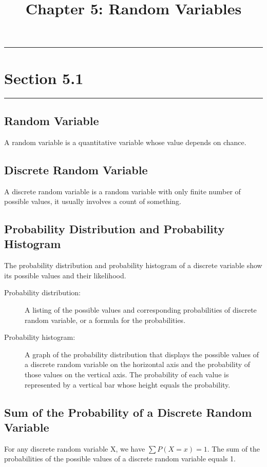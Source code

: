 \documentclass[12pt]{article}
\title{Chapter 5: Random Variables}
\author{}
\begin{document}
    \maketitle

    \noindent\rule{\textwidth}{0.4pt}
    \section*{Section 5.1}
    \noindent\rule{\textwidth}{0.4pt}
        \subsection*{Random Variable}
            A random variable is a quantitative variable whose value depends on chance.
        \subsection*{Discrete Random Variable}
            A discrete random variable is a random variable with only finite number of possible values, it
            usually involves a count of something.
        \subsection*{Probability Distribution and Probability Histogram}
            The probability distribution and probability histogram of a discrete variable show its 
            possible values and their likelihood.
            \begin{description}
                \item[Probability distribution:] A listing of the possible values and corresponding
                probabilities of discrete random variable, or a formula for the probabilities.
                \item[Probability histogram:] A graph of the probability distribution that displays the 
                possible values of a discrete random variable on the horizontal axis and the probability of
                those values on the vertical axis. The probability of each value is represented by a vertical
                bar whose height equals the probability.
            \end{description}
        \subsection*{Sum of the Probability of a Discrete Random Variable}
            For any discrete random variable X, we have $\sum P(X=x)=1$. The sum of the probabilities of
            the possible values of a discrete random variable equals 1.
\end{document}
